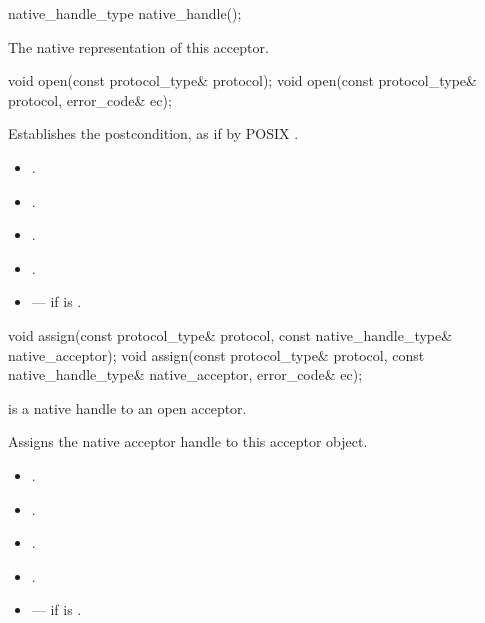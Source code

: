 \begin{itemdecl}
native_handle_type native_handle();
\end{itemdecl}

\begin{itemdescr}
\pnum
\returns The native representation of this acceptor.
\end{itemdescr}

\begin{itemdecl}
void open(const protocol_type& protocol);
void open(const protocol_type& protocol, error_code& ec);
\end{itemdecl}

\begin{itemdescr}
\pnum
\effects Establishes the postcondition, as if by POSIX .

\pnum
\postconditions 
\begin{itemize}
\item
{}.
\item
{}.
\item
{}.
\item
{}.
\end{itemize}

\pnum
\errors
\begin{itemize}
\item
{} --- if  is .
\end{itemize}
\end{itemdescr}

\begin{itemdecl}
void assign(const protocol_type& protocol,
            const native_handle_type& native_acceptor);
void assign(const protocol_type& protocol,
            const native_handle_type& native_acceptor, error_code& ec);
\end{itemdecl}

\begin{itemdescr}
\pnum
\requires {} is a native handle to an open acceptor.

\pnum
\effects Assigns the native acceptor handle to this acceptor object.

\pnum
\postconditions 
\begin{itemize}
\item
{}.
\item
{}.
\item
{}.
\item
{}.
\end{itemize}

\pnum
\errors
\begin{itemize}
\item
{} --- if  is .
\end{itemize}
\end{itemdescr}

